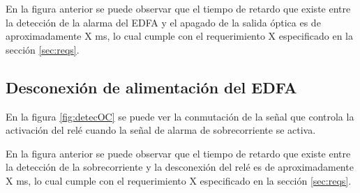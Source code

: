 
En la figura anterior se puede observar que el tiempo de retardo que existe entre la detección de la alarma del EDFA y el apagado de la salida óptica es de aproximadamente X ms, lo cual cumple con el requerimiento X especificado en la sección \ref{sec:reqs}.

\subsection{Desconexión de alimentación del EDFA}

En la figura \ref{fig:detecOC} se puede ver la conmutación de la señal que controla la activación del relé cuando la señal de alarma de sobrecorriente se activa. 


En la figura anterior se puede observar que el tiempo de retardo que existe entre la detección de la sobrecorriente y la desconexión del relé es de aproximadamente X ms, lo cual cumple con el requerimiento X especificado en la sección \ref{sec:reqs}.